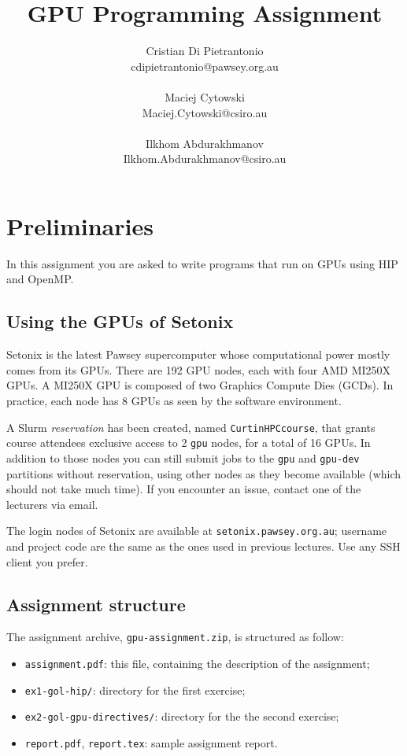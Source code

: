\documentclass[a4paper, 11pt]{article}
\title{GPU Programming Assignment}
\author{Cristian Di Pietrantonio\\cdipietrantonio@pawsey.org.au\\\vspace{0.3em}\\
	Maciej Cytowski\\Maciej.Cytowski@csiro.au\\\vspace{0.3em}\\Ilkhom Abdurakhmanov\\Ilkhom.Abdurakhmanov@csiro.au}
\date{}
\begin{document}
	\maketitle
	
	\section{Preliminaries}
	
	In this assignment you are asked to write programs that run on GPUs using HIP and OpenMP.
	
	\subsection{Using the GPUs of Setonix}
	Setonix is the latest Pawsey supercomputer whose computational power mostly comes from its GPUs. There are 192 GPU nodes, each with four AMD MI250X GPUs. A MI250X GPU is composed of two Graphics Compute Dies (GCDs). In practice, each node has 8 GPUs as seen by the software environment.

	A Slurm \textit{reservation} has been created, named \texttt{CurtinHPCcourse}, that grants course attendees exclusive access to 2 \texttt{gpu} nodes, for a total of 16 GPUs. In addition to those nodes you can still submit jobs to the \texttt{gpu} and \texttt{gpu-dev} partitions without reservation, using other nodes as they become available (which should not take much time). If you encounter an issue, contact one of the lecturers via email.
	
	The login nodes of Setonix are available at \texttt{setonix.pawsey.org.au}; username and project code are the same as the ones used in previous lectures. Use any SSH client you prefer.
	
	\subsection{Assignment structure}
	
	The assignment archive, \texttt{gpu-assignment.zip}, is structured as follow:
	
	\begin{itemize}
		\item \texttt{assignment.pdf}: this file, containing the description of the assignment;
		\item \texttt{ex1-gol-hip/}: directory for the first exercise;
		\item  \texttt{ex2-gol-gpu-directives/}: directory for the the second exercise;
		\item \texttt{report.pdf}, \texttt{report.tex}: sample assignment report.
		
	\end{itemize}
	
\end{document}
